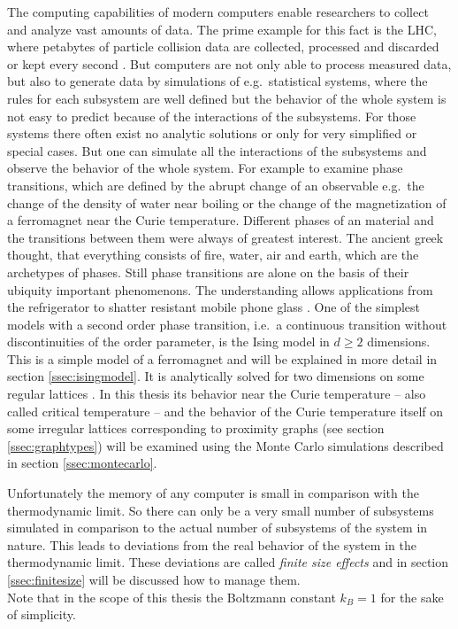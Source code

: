 The computing capabilities of modern computers enable researchers to
collect and analyze vast amounts of data. The prime example for this fact
is the LHC, where petabytes of particle collision data are collected,
processed and discarded or kept every second \cite{LHC}.
But computers are not only able to process measured data, but
also to generate data by simulations of e.g.\ statistical systems, where
the rules for each subsystem are well defined but the behavior of the
whole system is not easy to predict because of the interactions of the
subsystems. For those systems there often exist no analytic solutions
or only for very simplified or special cases. But one can simulate all
the interactions of the subsystems and observe the behavior of the whole
system.
For example to examine phase transitions, which are defined by the abrupt
change of an observable e.g.\ the change of the density of water near
boiling or the change of the magnetization of a ferromagnet near the
Curie temperature.
Different phases of an material and the transitions between them were
always of greatest interest. The ancient greek thought, that everything
consists of fire, water, air and earth, which are the archetypes of
phases. Still phase transitions are alone on the basis of their ubiquity
important phenomenons. The understanding allows applications from the
refrigerator to shatter resistant mobile phone glass \cite{PJournalGlass}.
One of the simplest models with a second order
phase transition, i.e.\ a continuous transition without discontinuities of
the order parameter, is the Ising model \cite{Ising1925} in \(d \ge 2\)
dimensions. This is a simple
model of a ferromagnet and will be explained in more detail in section
\ref{ssec:isingmodel}. It is analytically solved for two dimensions on
some regular lattices \cite{Onsager1944} \cite{Wannier1945}.
In this thesis its behavior near the Curie temperature -- also called
critical temperature -- and the behavior of the Curie temperature itself
on some irregular lattices corresponding to proximity graphs
(see section \ref{ssec:graphtypes}) will be examined using the Monte
Carlo simulations described in section \ref{ssec:montecarlo}.

Unfortunately the memory of any computer is small in comparison with the
thermodynamic limit. So there can only be a very small number of
subsystems simulated in comparison to the actual number of subsystems
of the system in nature. This leads to deviations from the real behavior
of the system in the thermodynamic limit. These deviations are called
\emph{finite size effects} and in section \ref{ssec:finitesize} will be
discussed how to manage them.\\

Note that in the scope of this thesis the Boltzmann constant \(k_{B}=1\)
for the sake of simplicity.
